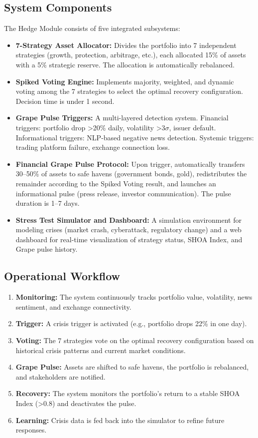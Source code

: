 \documentclass[12pt]{article}
\begin{document}
\subsection{System Components}
The Hedge Module consists of five integrated subsystems:
\begin{itemize}
    \item \textbf{7-Strategy Asset Allocator:} Divides the portfolio into 7 independent strategies (growth, protection, arbitrage, etc.), each allocated 15\% of assets with a 5\% strategic reserve. The allocation is automatically rebalanced.
    \item \textbf{Spiked Voting Engine:} Implements majority, weighted, and dynamic voting among the 7 strategies to select the optimal recovery configuration. Decision time is under 1 second.
    \item \textbf{Grape Pulse Triggers:} A multi-layered detection system. Financial triggers: portfolio drop >20\% daily, volatility >3$\sigma$, issuer default. Informational triggers: NLP-based negative news detection. Systemic triggers: trading platform failure, exchange connection loss.
    \item \textbf{Financial Grape Pulse Protocol:} Upon trigger, automatically transfers 30--50\% of assets to safe havens (government bonds, gold), redistributes the remainder according to the Spiked Voting result, and launches an informational pulse (press release, investor communication). The pulse duration is 1--7 days.
    \item \textbf{Stress Test Simulator and Dashboard:} A simulation environment for modeling crises (market crash, cyberattack, regulatory change) and a web dashboard for real-time visualization of strategy status, SHOA Index, and Grape pulse history.
\end{itemize}

\subsection{Operational Workflow}
\begin{enumerate}
    \item \textbf{Monitoring:} The system continuously tracks portfolio value, volatility, news sentiment, and exchange connectivity.
    \item \textbf{Trigger:} A crisis trigger is activated (e.g., portfolio drops 22\% in one day).
    \item \textbf{Voting:} The 7 strategies vote on the optimal recovery configuration based on historical crisis patterns and current market conditions.
    \item \textbf{Grape Pulse:} Assets are shifted to safe havens, the portfolio is rebalanced, and stakeholders are notified.
    \item \textbf{Recovery:} The system monitors the portfolio's return to a stable SHOA Index (>0.8) and deactivates the pulse.
    \item \textbf{Learning:} Crisis data is fed back into the simulator to refine future responses.
\end{enumerate}
\end{document}
